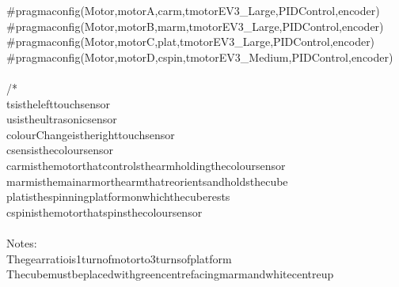 \documentclass[a4paper, 10pt]{article}
\newcommand\SPC{\hspace*{0.6em}}
\newcommand\QOT{\mbox{\char 34}}
\newcommand{\CppAComment}[1]{\textcolor[rgb]{0,0.5,0}{\colorbox[rgb]{1,1,1}{#1}}}
\newcommand{\CppAPreprocessor}[1]{\textcolor[rgb]{0,0.5,0}{\colorbox[rgb]{1,1,1}{#1}}}
\begin{document}
\begin{ttfamily}
\CppAPreprocessor{\#pragma\SPC config(Motor,\SPC \SPC motorA,\SPC \SPC \SPC \SPC \SPC \SPC \SPC \SPC \SPC \SPC carm,\SPC \SPC \SPC \SPC \SPC \SPC \SPC \SPC \SPC \SPC tmotorEV3\_Large,\SPC PIDControl,\SPC encoder)}\\
\CppAPreprocessor{\#pragma\SPC config(Motor,\SPC \SPC motorB,\SPC \SPC \SPC \SPC \SPC \SPC \SPC \SPC \SPC \SPC marm,\SPC \SPC \SPC \SPC \SPC \SPC \SPC \SPC \SPC \SPC tmotorEV3\_Large,\SPC PIDControl,\SPC encoder)}\\
\CppAPreprocessor{\#pragma\SPC config(Motor,\SPC \SPC motorC,\SPC \SPC \SPC \SPC \SPC \SPC \SPC \SPC \SPC \SPC plat,\SPC \SPC \SPC \SPC \SPC \SPC \SPC \SPC \SPC \SPC tmotorEV3\_Large,\SPC PIDControl,\SPC encoder)}\\
\CppAPreprocessor{\#pragma\SPC config(Motor,\SPC \SPC motorD,\SPC \SPC \SPC \SPC \SPC \SPC \SPC \SPC \SPC \SPC cspin,\SPC \SPC \SPC \SPC \SPC \SPC \SPC \SPC \SPC tmotorEV3\_Medium,\SPC PIDControl,\SPC encoder)}\\
\\
\CppAComment{/*}\\
\CppAComment{ts\SPC is\SPC the\SPC left\SPC touch\SPC sensor}\\
\CppAComment{us\SPC is\SPC the\SPC ultrasonic\SPC sensor}\\
\CppAComment{colourChange\SPC is\SPC the\SPC right\SPC touch\SPC sensor}\\
\CppAComment{csens\SPC is\SPC the\SPC colour\SPC sensor}\\
\CppAComment{carm\SPC is\SPC the\SPC motor\SPC that\SPC controls\SPC the\SPC arm\SPC holding\SPC the\SPC colour\SPC sensor}\\
\CppAComment{marm\SPC is\SPC the\SPC \QOT main\SPC arm\QOT \SPC or\SPC the\SPC arm\SPC that\SPC reorients\SPC and\SPC holds\SPC the\SPC cube}\\
\CppAComment{plat\SPC is\SPC the\SPC spinning\SPC platform\SPC on\SPC which\SPC the\SPC cube\SPC rests}\\
\CppAComment{cspin\SPC is\SPC the\SPC motor\SPC that\SPC spins\SPC the\SPC colour\SPC sensor}\\
\\
\CppAComment{Notes:}\\
\CppAComment{The\SPC gear\SPC ratio\SPC is\SPC 1\SPC turn\SPC of\SPC motor\SPC to\SPC 3\SPC turns\SPC of\SPC platform}\\
\CppAComment{The\SPC cube\SPC must\SPC be\SPC placed\SPC with\SPC green\SPC centre\SPC facing\SPC marm\SPC and\SPC white\SPC centre\SPC up}\\

\end{ttfamily}
\end{document}
